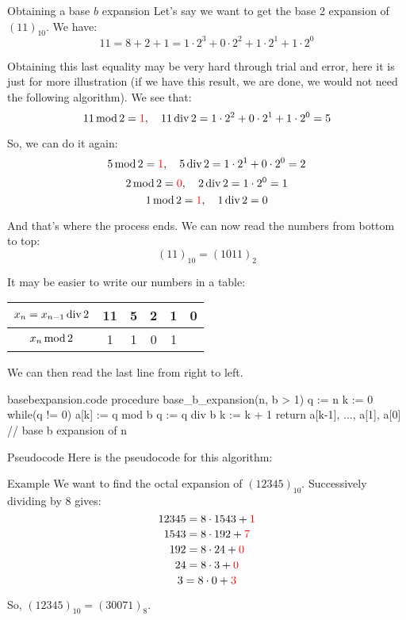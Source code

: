 \documentclass[a4paper]{article}
\begin{document}
\begin{parag}{Obtaining a base $b$ expansion}
    Let's say we want to get the base 2 expansion of $\left(11\right)_{10}$. We have: 
    \[11 = 8 + 2 + 1 = 1 \cdot 2^3 + 0\cdot 2^2 + 1\cdot 2^1 + 1\cdot 2^0\]
    
    Obtaining this last equality may be very hard through trial and error, here it is just for more illustration (if we have this result, we are done, we would not need the following algorithm). We see that: 
    \[11 \operatorname{mod} 2 = {\color{red}1}, \quad 11 \operatorname{div} 2 = 1\cdot 2^2 + 0\cdot 2^1 + 1\cdot 2^0 = 5\]
    
    So, we can do it again: 
    \[5 \operatorname{mod} 2 = {\color{red}1}, \quad 5 \operatorname{div} 2 = 1\cdot 2^1 + 0\cdot 2^0 = 2\]
    \[2 \operatorname{mod} 2 = {\color{red}0}, \quad 2 \operatorname{div} 2 = 1\cdot 2^0 = 1\]
    \[1 \operatorname{mod} 2 = {\color{red}1}, \quad 1 \operatorname{div} 2 = 0\]

    And that's where the process ends. We can now read the numbers from bottom to top: 
    \[\left(11\right)_{10} = \left(1011\right)_2\]

    It may be easier to write our numbers in a table:
    \begin{center}
    \begin{tabular}{|c|c|c|c|c|c|}
        \hline
        $x_{n} = x_{n-1} \operatorname{div} 2$ & 11 & 5 & 2 & 1 & 0 \\
        \hline
        $x_{n} \operatorname{mod} 2$ & 1 & 1 & 0 & 1 & \\
        \hline
    \end{tabular}
    \end{center}

    We can then read the last line from right to left.
\end{parag}


\begin{filecontents*}[overwrite]{basebexpansion.code}
procedure base_b_expansion(n, b > 1)
    q := n
    k := 0
    while(q != 0)
        a[k] := q mod b
        q := q div b
        k := k + 1
    return {a[k-1], ..., a[1], a[0]}  // base b expansion of n
\end{filecontents*}

\begin{parag}{Pseudocode}
    Here is the pseudocode for this algorithm:

\end{parag}


\begin{parag}{Example}
    We want to find the octal expansion of $\left(12345\right)_{10}$. Successively dividing by 8 gives: 
    \[12345 = 8\cdot 1543 + {\color{red}1}\]
    \[1543 = 8\cdot 192 + {\color{red}7}\]
    \[192 = 8\cdot 24 + {\color{red}0}\]
    \[24 = 8\cdot 3 + {\color{red}0}\]
    \[3 = 8\cdot 0 + {\color{red}3}\]

    So, $\left(12345\right)_{10} = \left(30071\right)_8$.
\end{parag}
\end{document}
